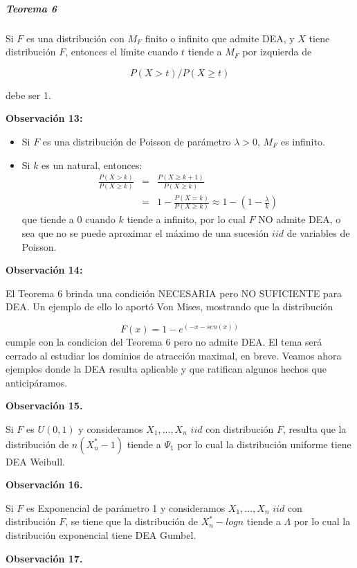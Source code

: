 \documentclass[
  oneside]{article}
\begin{document}
\hypertarget{teorema-6}{%
\subparagraph{Teorema 6}\label{teorema-6}}

Si \(F\) es una distribución con \(M_F\) finito o infinito que admite
DEA, y \(X\) tiene distribución \(F\), entonces el límite cuando \(t\)
tiende a \(M_F\) por izquierda de

\[P(X>t)/P(X \geq t)\]

debe ser 1.

\textbf{Observación 13:}

\begin{itemize}
\item Si $F$ es una distribución de Poisson de parámetro $\lambda>0$, $M_F$ es infinito. 
\item Si $k$ es un natural, entonces:
\begin{eqnarray}
\frac{P(X>k)}{P(X\geq k)} &=& \frac{P(X \geq k+1)}{P(X\geq k)} \\ \nonumber
&=& 1-\frac{P(X=k)}{P(X \geq k)} \approx 1-\left(1- \frac{\lambda}{k}\right) 
\end{eqnarray}
que tiende a $0$ cuando $k$ tiende a infinito, por lo cual $F$ NO admite DEA, o sea que no se puede aproximar el máximo de una sucesión $iid$ de variables de Poisson.
\end{itemize}

\textbf{Observación 14:}

El Teorema 6 brinda una condición NECESARIA pero NO SUFICIENTE para DEA.
Un ejemplo de ello lo aportó Von Mises, mostrando que la distribución

\[F(x)= 1- e^{(-x-sen(x))}\] cumple con la condicion del Teorema 6 pero
no admite DEA. El tema será cerrado al estudiar los dominios de
atracción maximal, en breve. Veamos ahora ejemplos donde la DEA resulta
aplicable y que ratifican algunos hechos que anticipáramos.

\textbf{Observación 15.}

Si \(F\) es \(U(0,1)\) y consideramos \(X_1,...,X_n\) \(iid\) con
distribución \(F\), resulta que la distribución de \(n( X_n^*- 1)\)
tiende a \(\Psi_1\) por lo cual la distribución uniforme tiene DEA
Weibull.

\textbf{Observación 16.}

Si \(F\) es Exponencial de parámetro 1 y consideramos \(X_1,...,X_n\)
\(iid\) con distribución \(F\), se tiene que la distribución de
\(X_n^*- log n\) tiende a \(\Lambda\) por lo cual la distribución
exponencial tiene DEA Gumbel.

\textbf{Observación 17.}
\end{document}
